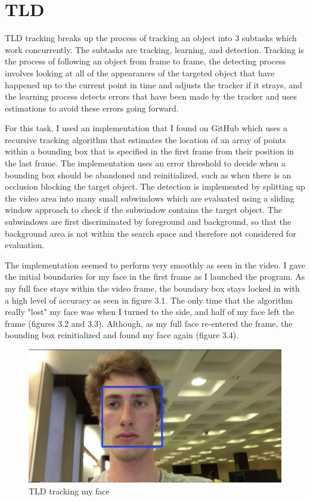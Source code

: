 \documentclass[paper=a4, fontsize=11pt]{scrartcl} %
\numberwithin{equation}{section} %
\numberwithin{figure}{section} %
\numberwithin{table}{section} %
\begin{document}
\section{TLD}

TLD tracking breaks up the process of tracking an object into 3 subtasks which work concurrently. The subtasks are tracking, learning, and detection. Tracking is the process of following an object from frame to frame, the detecting process involves looking at all of the appearances of the targeted object that have happened up to the current point in time and adjusts the tracker if it strays, and the learning process detects errors that have been made by the tracker and uses estimations to avoid these errors going forward.

For this task, I used an implementation that I found on GitHub which uses a recursive tracking algorithm that estimates the location of an array of points within a bounding box that is specified in the first frame from their position in the last frame. The implementation uses an error threshold to decide when a bounding box should be abandoned and reinitialized, such as when there is an occlusion blocking the target object. The detection is implemented by splitting up the video area into many small subwindows which are evaluated using a sliding window approach to check if the subwindow contains the target object. The subwindows are first discriminated by foreground and background, so that the background area is not within the search space and therefore not considered for evaluation.

The implementation seemed to perform very smoothly as seen in the video. I gave the initial boundaries for my face in the first frame as I launched the program. As my full face stays within the video frame, the  boundary box stays locked in with a high level of accuracy as seen in figure 3.1. The only time that the algorithm really "lost" my face was when I turned to the side, and half of my face left the frame (figures 3.2 and 3.3). Although, as my full face re-entered the frame, the bounding box reinitialized and found my face again (figure 3.4).

\begin{figure}[H]
  \centering
  \begin{minipage}[b]{0.7\textwidth}
    \includegraphics[width=\textwidth]{tld_1.png}
    \caption{TLD tracking my face}
  \end{minipage}
\end{figure}
\end{document}
